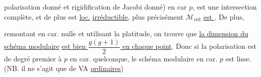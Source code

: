 polarisation donné et rigidification de Jacobi
 donné) en car $p$, est 
une intersection complète, et de plus est \uline{loc.}
\uline{irréductible}, plus précisément
$\mathcal M_{\text{réd}}$ \uline{est }
.
De plus, 

remontant en car. nulle et utilisant la platitude, on trouve que
\uline{la dimension du schéma modulaire} 
\uline{est bien $\dfrac{g(g+1)}2$ en chaque point}.
Donc si la polarisation est de degré premier à $p$
 en car. quelconque, le schéma modulaire en car. $p$
est lisse.
(NB. il ne s'agit que de VA \uline{ordinaires})
